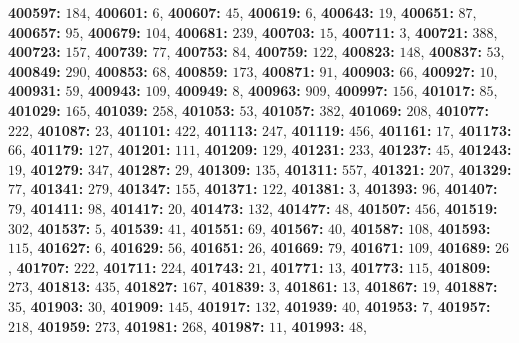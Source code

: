 \textsf{\bfseries 400597:} $184$, \textsf{\bfseries 400601:} $6$, \textsf{\bfseries 400607:} $45$, \textsf{\bfseries 400619:} $6$, \textsf{\bfseries 400643:} $19$, \textsf{\bfseries 400651:} $87$, \textsf{\bfseries 400657:} $95$, \textsf{\bfseries 400679:} $104$, \textsf{\bfseries 400681:} $239$, \textsf{\bfseries 400703:} $15$, \textsf{\bfseries 400711:} $3$, \textsf{\bfseries 400721:} $388$, \textsf{\bfseries 400723:} $157$, \textsf{\bfseries 400739:} $77$, \textsf{\bfseries 400753:} $84$, \textsf{\bfseries 400759:} $122$, \textsf{\bfseries 400823:} $148$, \textsf{\bfseries 400837:} $53$, \textsf{\bfseries 400849:} $290$, \textsf{\bfseries 400853:} $68$, \textsf{\bfseries 400859:} $173$, \textsf{\bfseries 400871:} $91$, \textsf{\bfseries 400903:} $66$, \textsf{\bfseries 400927:} $10$, \textsf{\bfseries 400931:} $59$, \textsf{\bfseries 400943:} $109$, \textsf{\bfseries 400949:} $8$, \textsf{\bfseries 400963:} $909$, \textsf{\bfseries 400997:} $156$, \textsf{\bfseries 401017:} $85$, \textsf{\bfseries 401029:} $165$, \textsf{\bfseries 401039:} $258$, \textsf{\bfseries 401053:} $53$, \textsf{\bfseries 401057:} $382$, \textsf{\bfseries 401069:} $208$, \textsf{\bfseries 401077:} $222$, \textsf{\bfseries 401087:} $23$, \textsf{\bfseries 401101:} $422$, \textsf{\bfseries 401113:} $247$, \textsf{\bfseries 401119:} $456$, \textsf{\bfseries 401161:} $17$, \textsf{\bfseries 401173:} $66$, \textsf{\bfseries 401179:} $127$, \textsf{\bfseries 401201:} $111$, \textsf{\bfseries 401209:} $129$, \textsf{\bfseries 401231:} $233$, \textsf{\bfseries 401237:} $45$, \textsf{\bfseries 401243:} $19$, \textsf{\bfseries 401279:} $347$, \textsf{\bfseries 401287:} $29$, \textsf{\bfseries 401309:} $135$, \textsf{\bfseries 401311:} $557$, \textsf{\bfseries 401321:} $207$, \textsf{\bfseries 401329:} $77$, \textsf{\bfseries 401341:} $279$, \textsf{\bfseries 401347:} $155$, \textsf{\bfseries 401371:} $122$, \textsf{\bfseries 401381:} $3$, \textsf{\bfseries 401393:} $96$, \textsf{\bfseries 401407:} $79$, \textsf{\bfseries 401411:} $98$, \textsf{\bfseries 401417:} $20$, \textsf{\bfseries 401473:} $132$, \textsf{\bfseries 401477:} $48$, \textsf{\bfseries 401507:} $456$, \textsf{\bfseries 401519:} $302$, \textsf{\bfseries 401537:} $5$, \textsf{\bfseries 401539:} $41$, \textsf{\bfseries 401551:} $69$, \textsf{\bfseries 401567:} $40$, \textsf{\bfseries 401587:} $108$, \textsf{\bfseries 401593:} $115$, \textsf{\bfseries 401627:} $6$, \textsf{\bfseries 401629:} $56$, \textsf{\bfseries 401651:} $26$, \textsf{\bfseries 401669:} $79$, \textsf{\bfseries 401671:} $109$, \textsf{\bfseries 401689:} $26$, \textsf{\bfseries 401707:} $222$, \textsf{\bfseries 401711:} $224$, \textsf{\bfseries 401743:} $21$, \textsf{\bfseries 401771:} $13$, \textsf{\bfseries 401773:} $115$, \textsf{\bfseries 401809:} $273$, \textsf{\bfseries 401813:} $435$, \textsf{\bfseries 401827:} $167$, \textsf{\bfseries 401839:} $3$, \textsf{\bfseries 401861:} $13$, \textsf{\bfseries 401867:} $19$, \textsf{\bfseries 401887:} $35$, \textsf{\bfseries 401903:} $30$, \textsf{\bfseries 401909:} $145$, \textsf{\bfseries 401917:} $132$, \textsf{\bfseries 401939:} $40$, \textsf{\bfseries 401953:} $7$, \textsf{\bfseries 401957:} $218$, \textsf{\bfseries 401959:} $273$, \textsf{\bfseries 401981:} $268$, \textsf{\bfseries 401987:} $11$, \textsf{\bfseries 401993:} $48$, 
